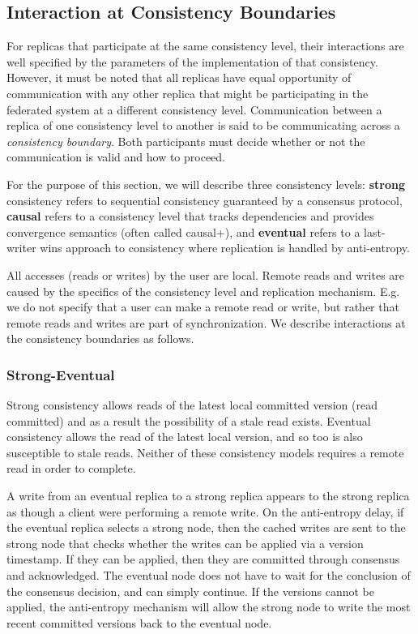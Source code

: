 \documentclass[letterpaper,twocolumn,10pt]{article}
\begin{document}
\subsection{Interaction at Consistency Boundaries}

For replicas that participate at the same consistency level, their interactions are well specified by the parameters of the implementation of that consistency. However, it must be noted that all replicas have equal opportunity of communication with any other replica that might be participating in the federated system at a different consistency level. Communication between a replica of one consistency level to another is said to be communicating across a \textit{consistency boundary}. Both participants must decide whether or not the communication is valid and how to proceed.

For the purpose of this section, we will describe three consistency levels: \textbf{strong} consistency refers to sequential consistency guaranteed by a consensus protocol, \textbf{causal} refers to a consistency level that tracks dependencies and provides convergence semantics (often called causal+), and \textbf{eventual} refers to a last-writer wins approach to consistency where replication is handled by anti-entropy.

All accesses (reads or writes) by the user are local. Remote reads and writes are caused by the specifics of the consistency level and replication mechanism. E.g. we do not specify that a user can make a remote read or write, but rather that remote reads and writes are part of synchronization. We describe interactions at the consistency boundaries as follows.

\subsubsection{Strong-Eventual}

Strong consistency allows reads of the latest local committed version (read committed) and as a result the possibility of a stale read exists. Eventual consistency allows the read of the latest local version, and so too is also susceptible to stale reads. Neither of these consistency models requires a remote read in order to complete.

A write from an eventual replica to a strong replica appears to the strong replica as though a client were performing a remote write. On the anti-entropy delay, if the eventual replica selects a strong node, then the cached writes are sent to the strong node that checks whether the writes can be applied via a version timestamp. If they can be applied, then they are committed through consensus and acknowledged. The eventual node does not have to wait for the conclusion of the consensus decision, and can simply continue. If the versions cannot be applied, the anti-entropy mechanism will allow the strong node to write the most recent committed versions back to the eventual node.
\end{document}

